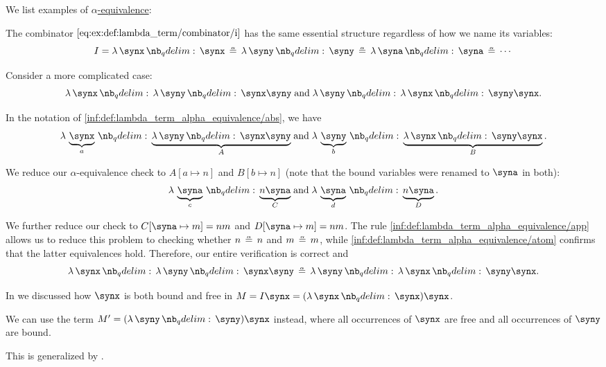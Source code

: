\begin{example}\label{ex:def:lambda_term_alpha_equivalence}
  We list examples of \hyperref[def:lambda_term_alpha_equivalence]{\( \alpha \)-equivalence}:
  \begin{thmenum}
     The combinator \( \ref{eq:ex:def:lambda_term/combinator/i} \) has the same essential structure regardless of how we name its variables:
    \begin{equation*}
      I = \qabs \synx \synx \aequiv \qabs \syny \syny \aequiv \qabs \syna \syna \aequiv \cdots
    \end{equation*}

     Consider a more complicated case:
    \begin{equation*}
      \qabs \synx \qabs \syny \synx \syny
      \T{and}
      \qabs \syny \qabs \synx \syny \synx.
    \end{equation*}

    In the notation of \ref{inf:def:lambda_term_alpha_equivalence/abs}, we have
    \begin{equation*}
      \qabs {\underbrace{\synx}_a} \underbrace{\qabs \syny \synx \syny}_A
      \T{and}
      \qabs {\underbrace{\syny}_b} \underbrace{\qabs \synx \syny \synx}_B.
    \end{equation*}

    We reduce our \( \alpha \)-equivalence check to \( A[a \mapsto n] \) and \( B[b \mapsto n] \) (note that the bound variables were renamed to \( \syna \) in both):
    \begin{equation*}
      \qabs {\underbrace{\syna}_c} \underbrace{n \syna}_C
      \T{and}
      \qabs {\underbrace{\syna}_d} \underbrace{n \syna}_D.
    \end{equation*}

    We further reduce our check to \( C[\syna \mapsto m] = nm \) and \( D[\syna \mapsto m] = nm \). The rule \ref{inf:def:lambda_term_alpha_equivalence/app} allows us to reduce this problem to checking whether \( n \aequiv n \) and \( m \aequiv m \), while \ref{inf:def:lambda_term_alpha_equivalence/atom} confirms that the latter equivalences hold. Therefore, our entire verification is correct and
    \begin{equation*}
      \qabs \synx \qabs \syny \synx \syny \aequiv \qabs \syny \qabs \synx \syny \synx.
    \end{equation*}

     In  we discussed how \( \synx \) is both bound and free in \( M = I \synx = (\qabs \synx \synx) \synx \).

    We can use the term \( M' = (\qabs \syny \syny) \synx \) instead, where all occurrences of \( \synx \) are free and all occurrences of \( \syny \) are bound.

    This is generalized by .
  \end{thmenum}
\end{example}

